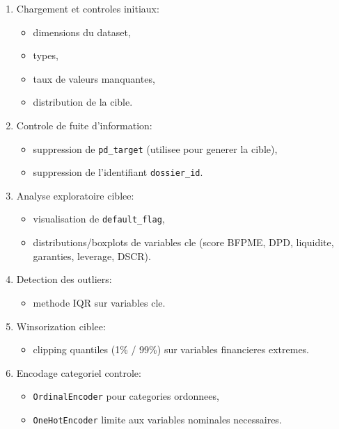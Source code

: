 \documentclass[11pt,a4paper]{article}
\begin{document}
\begin{enumerate}[leftmargin=1.2cm, label=\arabic*., widest=9]
  \item Chargement et controles initiaux:
  \begin{itemize}
    \item dimensions du dataset,
    \item types,
    \item taux de valeurs manquantes,
    \item distribution de la cible.
  \end{itemize}

  \item Controle de fuite d'information:
  \begin{itemize}
    \item suppression de \texttt{pd\_target} (utilisee pour generer la cible),
    \item suppression de l'identifiant \texttt{dossier\_id}.
  \end{itemize}

  \item Analyse exploratoire ciblee:
  \begin{itemize}
    \item visualisation de \texttt{default\_flag},
    \item distributions/boxplots de variables cle (score BFPME, DPD, liquidite, garanties, leverage, DSCR).
  \end{itemize}

  \item Detection des outliers:
  \begin{itemize}
    \item methode IQR sur variables cle.
  \end{itemize}

  \item Winsorization ciblee:
  \begin{itemize}
    \item clipping quantiles (1\% / 99\%) sur variables financieres extremes.
  \end{itemize}

  \item Encodage categoriel controle:
  \begin{itemize}
    \item \texttt{OrdinalEncoder} pour categories ordonnees,
    \item \texttt{OneHotEncoder} limite aux variables nominales necessaires.
  \end{itemize}


\end{enumerate}
\end{document}
